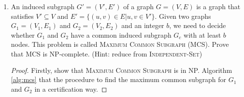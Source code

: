 \documentclass[12pt,a4paper]{article}
\theoremstyle{definition}
\begin{document}
\begin{enumerate}
\begin{proof}

       
    \end{proof}

    \item An induced subgraph $G'=(V',E')$ of a graph $G=(V,E)$ is a graph that satisfies $V'\subseteq V$ and $E' =\{(u,v)\in E| u,v\in V'\}$. Given two graphs $G_1=(V_1,E_1)$ and $G_2=(V_2,E_2)$ and an integer $b$, we need to decide whether $G_1$ and $G_2$ have a common induced subgraph $G_c$ with at least $b$ nodes. This problem is called \textsc{Maximum Common Subgraph} (MCS). Prove that MCS is NP-complete. (Hint: reduce from \textsc{Independent-Set})
    
    \begin{proof}
        Firstly, show that \textsc{Maximum Common Subgraph} is in NP. Algorithm \ref{alg:mcs} that the procedure to find the maximum common subgraph for $G_1$ and $G_2$ in a certification way.
        

\end{proof}
\end{enumerate}
\end{document}
